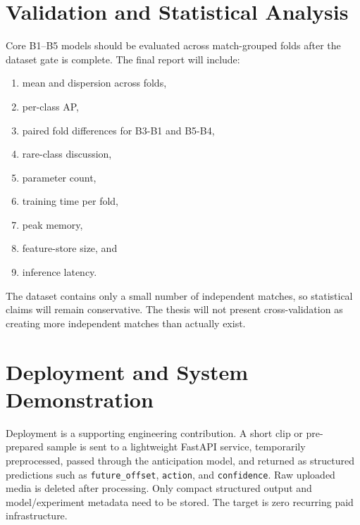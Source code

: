 \documentclass[11pt,a4paper]{article}
\begin{document}
\section{Validation and Statistical Analysis}
Core B1--B5 models should be evaluated across match-grouped folds after the dataset gate is complete. The final report will include:
\begin{enumerate}
  \item mean and dispersion across folds,
  \item per-class AP,
  \item paired fold differences for B3-B1 and B5-B4,
  \item rare-class discussion,
  \item parameter count,
  \item training time per fold,
  \item peak memory,
  \item feature-store size, and
  \item inference latency.
\end{enumerate}
The dataset contains only a small number of independent matches, so statistical claims will remain conservative. The thesis will not present cross-validation as creating more independent matches than actually exist.

\section{Deployment and System Demonstration}
Deployment is a supporting engineering contribution. A short clip or pre-prepared sample is sent to a lightweight FastAPI service, temporarily preprocessed, passed through the anticipation model, and returned as structured predictions such as \texttt{future\_offset}, \texttt{action}, and \texttt{confidence}. Raw uploaded media is deleted after processing. Only compact structured output and model/experiment metadata need to be stored. The target is zero recurring paid infrastructure.
\end{document}
